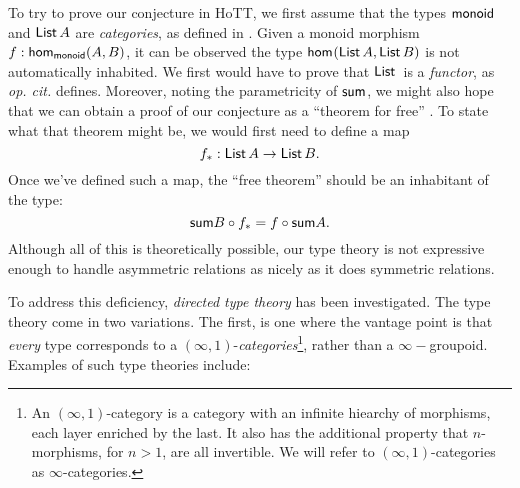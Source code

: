\documentclass[main.tex]{subfiles}
\begin{document}
To try to prove our conjecture in HoTT, we first assume that the types $\mon$ and $\Li{A}$ are \textit{categories}, as defined in \cite[9]{program_homotopy_2013}. Given a monoid morphism $f : \ho[\mon]{A}{B}$, it can be observed the type $\ho{\Li{A}}{\Li{B}}$ is not automatically inhabited. We first would have to prove that $\Li$ is a \textit{functor}, as \textit{op. cit.} defines. Moreover, noting the parametricity of $\add$, we might also hope that we can obtain a proof of our conjecture as a ``theorem for free'' \cite{wadler1989theorems}. To state what that theorem might be, we would first need to define a map
$$f_* : \Li{A} \to \Li{B}.$$
Once we've defined such a map, the ``free theorem'' should be an inhabitant of the type:
$$\add{B} \circ f_* = f \circ \add{A}.$$
Although all of this is theoretically possible, our type theory is not expressive enough to handle asymmetric relations as nicely as it does symmetric relations. 

To address this deficiency, \textit{directed type theory} has been investigated. The type theory come in two variations. The first, is one where the vantage point is that \textit{every} type corresponds to a $(\infty,1)$-\textit{categories}\footnote{An $(\infty,1)$-category is a category with an infinite hiearchy of morphisms, each layer enriched by the last. It also has the additional property that $n$-morphisms, for $n>1$, are all invertible. We will refer to $(\infty,1)$-categories as $\infty$-categories.}, rather than a $\infty-$groupoid. Examples of such type theories include:
\end{document}
